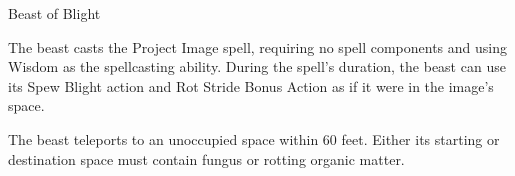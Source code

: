 \begin{DndMonster}[width=0.5\textwidth]{Beast of Blight\label{monster:BeastOfBlight}}
	The beast casts the Project Image spell, requiring no spell components and using Wisdom as the spellcasting ability. During the spell's duration, the beast can use its Spew Blight action and Rot Stride Bonus Action as if it were in the image's space.
	
	\DndMonsterSavingThrowEffect[%
		name		= {Spew Blight (Recharge 5-6)},	%
		save_skill	= {Dexterity},				%
		save_dc		= {17},						%
		targets		= {each creature in a 60-foot Cone},%
		failure		= {\DndDice{4d8} Necrotic damage, and the target has the Poisoned condition. The target repeats the saving throw at the end of each of its turns, ending the effect on itself on a success. After 1 minute, it automatically succeeds},%
		success		= {Half damage only},%
	]%
	
	The beast teleports to an unoccupied space within 60 feet. Either its starting or destination space must contain fungus or rotting organic matter.
\end{DndMonster}